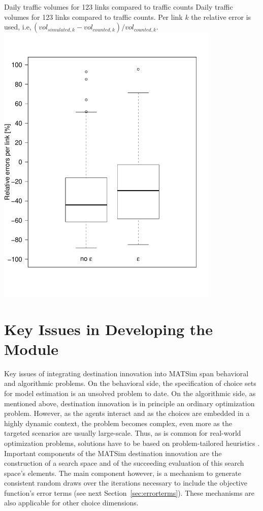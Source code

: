 \createfigure%
{Daily traffic volumes for 123 links compared to traffic counts}%
{Daily traffic volumes for 123 links compared to traffic counts. Per link $k$ the relative error is used, i.e,\,$(vol_{simulated,k}-vol_{counted,k}) / vol_{counted,k}$.}%
{\label{fig:countsLEGO}}%
{\includegraphics[width=0.8\textwidth, angle=0]{extending/figures/dc/zhCounts.pdf}}%
{}

\section{Key Issues in Developing the Module}
Key issues of integrating destination innovation into MATSim span behavioral and algorithmic problems. On the behavioral side, the specification of choice sets for model estimation is an unsolved problem to date. On the algorithmic side, as mentioned above, destination innovation is in principle an ordinary optimization problem. However, as the agents interact and as the choices are embedded in a highly dynamic context, the problem becomes complex, even more as the targeted scenarios are usually large-scale. Thus, as is common for real-world optimization problems, solutions have to be based on problem-tailored heuristics \citep[][]{MichalewiczFogel_2004}. Important components of the MATSim destination innovation are the construction of a search space and of the succeeding evaluation of this search space's elements. The main component however, is a mechanism to generate consistent random draws over the iterations necessary to include the objective function's error terms (see next Section~\ref{sec:errorterms}). These mechanisms are also applicable for other choice dimensions.

